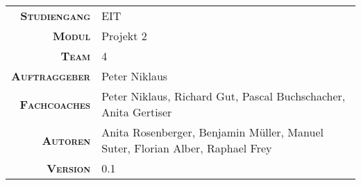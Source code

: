 \begin{titlepage}

    \maketitle

    \vspace{40mm}

    \begin{tabular}{r|l}

        \textsc{\textbf{Studiengang}}
        & EIT\\
        [4mm]

        \textsc{\textbf{Modul}}
        & Projekt 2 \\
        [4mm]

        \textsc{\textbf{Team}}
        & 4 \\
        [4mm]

        \textsc{\textbf{Auftraggeber}}
        & Peter Niklaus \\
        [4mm]

        \textsc{\textbf{Fachcoaches}}
        & Peter Niklaus, Richard Gut, Pascal Buchschacher, Anita Gertiser \\
        [4mm]

        \textsc{\textbf{Autoren}}
        & Anita Rosenberger, Benjamin M\"uller, Manuel Suter, Florian Alber, Raphael Frey\\
        [4mm]

        \textsc{\textbf{Version}}
        & 0.1 \\
    \end{tabular}

\end{titlepage}
